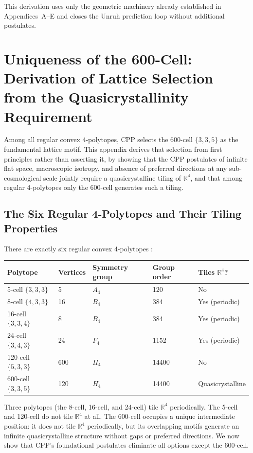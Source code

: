 \documentclass[11pt,letterpaper]{article}
\begin{document}
This derivation uses only the geometric machinery already established in Appendices~A–E and closes the Unruh prediction loop without additional postulates.


\section{Uniqueness of the 600-Cell: Derivation of Lattice Selection 
from the Quasicrystallinity Requirement}\label{app:G}

Among all regular convex 4-polytopes, CPP selects the 600-cell 
$\{3,3,5\}$ as the fundamental lattice motif. This appendix derives 
that selection from first principles rather than asserting it, by 
showing that the CPP postulates of infinite flat space, macroscopic 
isotropy, and absence of preferred directions at any sub-cosmological 
scale jointly require a quasicrystalline tiling of $\mathbb{R}^4$, 
and that among regular 4-polytopes only the 600-cell generates such 
a tiling.

\subsection{The Six Regular 4-Polytopes and Their Tiling Properties}

There are exactly six regular convex 4-polytopes \cite{coxeter1973}:

\begin{center}
\begin{tabular}{lllll}
\toprule
Polytope & Vertices & Symmetry group & Group order & Tiles $\mathbb{R}^4$? \\
\midrule
5-cell $\{3,3,3\}$ & 5 & $A_4$ & 120 & No \\
8-cell $\{4,3,3\}$ & 16 & $B_4$ & 384 & Yes (periodic) \\
16-cell $\{3,3,4\}$ & 8 & $B_4$ & 384 & Yes (periodic) \\
24-cell $\{3,4,3\}$ & 24 & $F_4$ & 1152 & Yes (periodic) \\
120-cell $\{5,3,3\}$ & 600 & $H_4$ & 14400 & No \\
600-cell $\{3,3,5\}$ & 120 & $H_4$ & 14400 & Quasicrystalline \\
\bottomrule
\end{tabular}
\end{center}

Three polytopes (the 8-cell, 16-cell, and 24-cell) tile $\mathbb{R}^4$ 
periodically. The 5-cell and 120-cell do not tile $\mathbb{R}^4$ at all. 
The 600-cell occupies a unique intermediate position: it does not tile
$\mathbb{R}^4$ periodically, but its overlapping motifs generate an infinite quasicrystalline structure without gaps or preferred directions. We now show that CPP's foundational postulates eliminate all options except the 600-cell.
\end{document}
